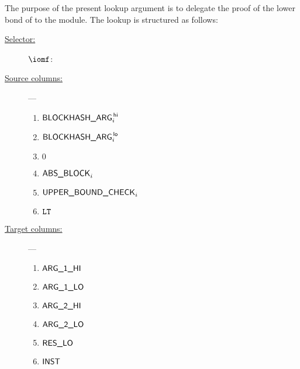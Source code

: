 The purpose of the present lookup argument is to delegate the proof of the lower bond of \blockHashArgument{} to the \wcpMod{} module.
The lookup is structured as follows:
\begin{description}
	\item[\underline{Selector:}] $\iomf$:
	\item[\underline{Source columns:}] ---
		\begin{multicols}{3}
			\begin{enumerate}
				\item $\textsf{BLOCKHASH\_ARG}^{\mathsf{\,hi}}_{i}$
				\item $\textsf{BLOCKHASH\_ARG}^{\mathsf{\,lo}}_{i}$
				\item $0$
				\item $\textsf{ABS\_BLOCK}_{i}$
				\item $\textsf{UPPER\_BOUND\_CHECK}_{i}$
				\item $\texttt{LT}$
			\end{enumerate}
		\end{multicols}
	\item[\underline{Target columns:}] ---
		\begin{multicols}{3}
		\begin{enumerate}
			\item $\textsf{ARG}\textsf{\_1}\textsf{\_HI}$
			\item $\textsf{ARG}\textsf{\_1}\textsf{\_LO}$
			\item $\textsf{ARG}\textsf{\_2}\textsf{\_HI}$
			\item $\textsf{ARG}\textsf{\_2}\textsf{\_LO}$
			\item $\textsf{RES}\textsf{\_LO}$
			\item $\textsf{INST}$
		\end{enumerate}
		\end{multicols}
\end{description}
